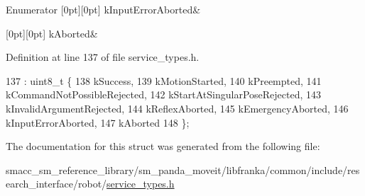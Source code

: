 \begin{DoxyEnumFields}{Enumerator}
[0pt][0pt]{}\mbox{\label{structresearch__interface_1_1robot_1_1Move_a74e15d249324a1b2d28f0a7cf50dc794acfa49311eb3442e8f47f921b951ef1eb}} 
k\+Input\+Error\+Aborted&\\
\hline

[0pt][0pt]{}\mbox{\label{structresearch__interface_1_1robot_1_1Move_a74e15d249324a1b2d28f0a7cf50dc794ac20d0424ae4484fda4424713f021d736}} 
k\+Aborted&\\
\hline

\end{DoxyEnumFields}


Definition at line 137 of file service\+\_\+types.\+h.


\begin{DoxyCode}
137                     : uint8\_t \{
138     kSuccess,
139     kMotionStarted,
140     kPreempted,
141     kCommandNotPossibleRejected,
142     kStartAtSingularPoseRejected,
143     kInvalidArgumentRejected,
144     kReflexAborted,
145     kEmergencyAborted,
146     kInputErrorAborted,
147     kAborted
148   \};
\end{DoxyCode}


The documentation for this struct was generated from the following file\+:\begin{DoxyCompactItemize}
\item 
smacc\+\_\+sm\+\_\+reference\+\_\+library/sm\+\_\+panda\+\_\+moveit/libfranka/common/include/research\+\_\+interface/robot/\hyperlink{service__types_8h}{service\+\_\+types.\+h}\end{DoxyCompactItemize}
